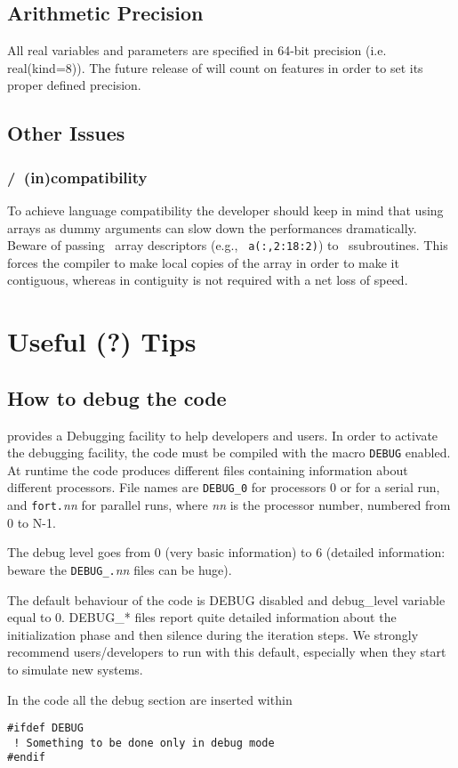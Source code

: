 \section{Arithmetic Precision}
All real variables and parameters are specified in 64-bit precision 
(i.e. real(kind=8)). 
The future release of \PR will count on \fort features in order to set its
proper defined precision. 

\section{Other Issues} 

\subsection{\fort/\oldfort\ (in)compatibility}

To achieve language compatibility the developer should keep in mind that
using arrays as dummy arguments can slow down the performances
dramatically. Beware of passing \fort\ array descriptors (e.g., {\tt
a(:,2:18:2)}) to \oldfort\ ssubroutines. This forces the \fort compiler to
make local copies of the array in order to make it contiguous, whereas in
\fort contiguity is not required with a net loss of speed.

\chapter{ Useful (?) Tips }

\section{How to debug the code }

\PR provides a Debugging facility to help developers and users.
In order to activate the debugging facility, the code must be compiled
with the macro \verb=DEBUG= enabled. 
At runtime the code produces different files containing information
about different processors. File names are \verb=DEBUG_0= for processors 0 
or for a serial run, and \verb=fort.={\it nn} for parallel runs, 
where {\it nn} is the processor number, numbered from 0 to N-1.

The debug level goes from 0 (very basic information) to 6 (detailed
information: beware the \verb=DEBUG_.={\it nn} files can be huge).

The default behaviour of the code is DEBUG disabled and debug\_level
variable equal to 0. DEBUG\_* files report quite detailed information about
the initialization phase and then silence during the iteration steps. 
We strongly recommend  users/developers to run with this default,
especially when they start to simulate new systems.

In the code all the debug section are inserted within
\begin{verbatim}
#ifdef DEBUG
 ! Something to be done only in debug mode
#endif
\end{verbatim}
